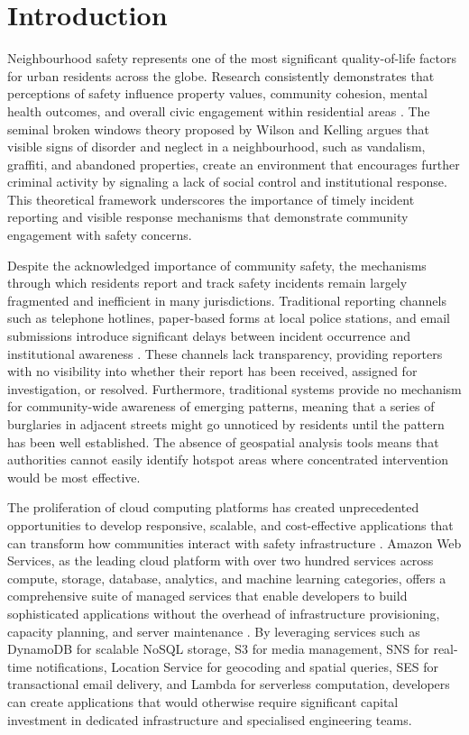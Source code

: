 \documentclass[conference]{IEEEtran}
\begin{document}
\section{Introduction}

Neighbourhood safety represents one of the most significant quality-of-life factors for urban residents across the globe. Research consistently demonstrates that perceptions of safety influence property values, community cohesion, mental health outcomes, and overall civic engagement within residential areas \cite{wilson1982broken}. The seminal broken windows theory proposed by Wilson and Kelling argues that visible signs of disorder and neglect in a neighbourhood, such as vandalism, graffiti, and abandoned properties, create an environment that encourages further criminal activity by signaling a lack of social control and institutional response. This theoretical framework underscores the importance of timely incident reporting and visible response mechanisms that demonstrate community engagement with safety concerns.

Despite the acknowledged importance of community safety, the mechanisms through which residents report and track safety incidents remain largely fragmented and inefficient in many jurisdictions. Traditional reporting channels such as telephone hotlines, paper-based forms at local police stations, and email submissions introduce significant delays between incident occurrence and institutional awareness \cite{cohen2004social}. These channels lack transparency, providing reporters with no visibility into whether their report has been received, assigned for investigation, or resolved. Furthermore, traditional systems provide no mechanism for community-wide awareness of emerging patterns, meaning that a series of burglaries in adjacent streets might go unnoticed by residents until the pattern has been well established. The absence of geospatial analysis tools means that authorities cannot easily identify hotspot areas where concentrated intervention would be most effective.

The proliferation of cloud computing platforms has created unprecedented opportunities to develop responsive, scalable, and cost-effective applications that can transform how communities interact with safety infrastructure \cite{armbrust2010view}. Amazon Web Services, as the leading cloud platform with over two hundred services across compute, storage, database, analytics, and machine learning categories, offers a comprehensive suite of managed services that enable developers to build sophisticated applications without the overhead of infrastructure provisioning, capacity planning, and server maintenance \cite{awswhitepaper2023}. By leveraging services such as DynamoDB for scalable NoSQL storage, S3 for media management, SNS for real-time notifications, Location Service for geocoding and spatial queries, SES for transactional email delivery, and Lambda for serverless computation, developers can create applications that would otherwise require significant capital investment in dedicated infrastructure and specialised engineering teams.
\end{document}
